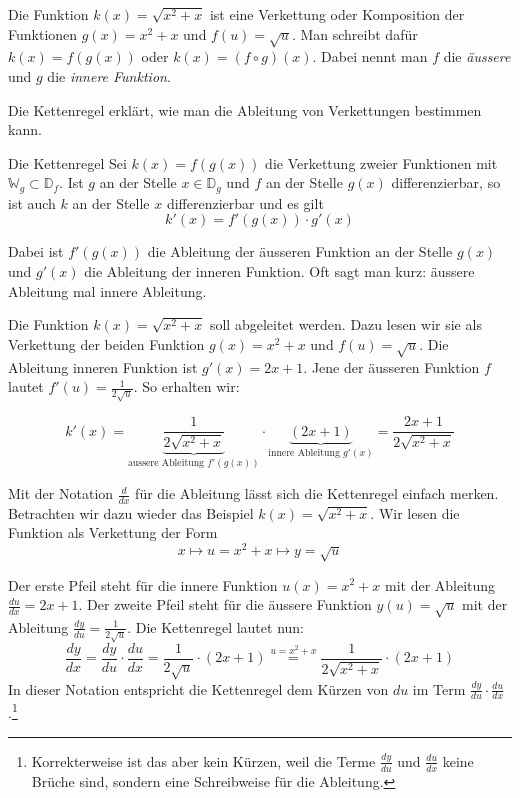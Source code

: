 \clearpage

Die Funktion $k(x)=\sqrt{x^2+x}$ ist eine Verkettung oder Komposition der Funktionen $g(x)=x^2+x$ und $f(u)=\sqrt{u}$. Man schreibt dafür $k(x)=f(g(x))$ oder $k(x)=(f\circ g)(x)$. Dabei nennt man $f$ die \emph{äussere} und $g$ die \emph{innere Funktion}.

Die Kettenregel erklärt, wie man die Ableitung von Verkettungen bestimmen kann.

\begin{satz}
	{Die Kettenregel}{}
	Sei $k(x)=f(g(x))$ die Verkettung zweier Funktionen mit $\mathbb{W}_g\subset \mathbb{D}_f$. Ist $g$ an der Stelle $x\in \mathbb{D}_g$ und $f$ an der Stelle $g(x)$ differenzierbar, so ist auch $k$ an der Stelle $x$ differenzierbar und es gilt
	$$k'(x)=f'(g(x))\cdot g'(x)$$

\end{satz}
Dabei ist $f'(g(x))$ die Ableitung der äusseren Funktion an der Stelle $g(x)$ und $g'(x)$ die Ableitung der inneren Funktion. Oft sagt man kurz: \glqq äussere Ableitung mal innere Ableitung\grqq{}.

\begin{bsp}
	{}{}
	Die Funktion $k(x)=\sqrt{x^2+x}$ soll abgeleitet werden. Dazu lesen wir sie als Verkettung der  beiden Funktion $g(x)=x^2+x$ und $f(u)=\sqrt{u}$. Die Ableitung inneren Funktion ist $g'(x) = 2x+1$. Jene der äusseren Funktion $f$ lautet $f'(u)=\frac{1}{2\sqrt{u}}$. So erhalten wir:

	$$k'(x) = \underbrace{\frac{1}{2\sqrt{x^2+x}}}_{\text{aussere Ableitung }f'(g(x))} \cdot \underbrace{(2x+1)}_{\text{innere Ableitung }g'(x)} = \frac{2x+1}{2\sqrt{x^2+x}}$$


\end{bsp}

Mit der Notation $\frac{d}{dx}$ für die Ableitung lässt sich die Kettenregel einfach merken. Betrachten wir dazu wieder das Beispiel $k(x)=\sqrt{x^2+x}$.
Wir lesen die Funktion als Verkettung der Form
$$x\mapsto u = x^2+x \mapsto y= \sqrt{u}$$

Der erste Pfeil steht für die innere Funktion $u(x)=x^2+x$ mit der Ableitung $\frac{du}{dx}=2x+1$. Der zweite Pfeil steht für die äussere Funktion $y(u)=\sqrt{u}$ mit der Ableitung $\frac{dy}{du}=\frac{1}{2\sqrt{u}}$. Die Kettenregel lautet nun:
$$\frac{dy}{dx}= \frac{dy}{du}\cdot \frac{du}{dx} = \frac{1}{2\sqrt{u}} \cdot (2x+1) \stackrel{u=x^2+x}{=} \frac{1}{2\sqrt{x^2+x}}\cdot (2x+1)$$
In dieser Notation entspricht die Kettenregel dem \glqq Kürzen\grqq{} von $du$ im Term $\frac{dy}{du}\cdot \frac{du}{dx}$.\footnote{Korrekterweise ist das aber kein Kürzen, weil die Terme $\frac{dy}{du}$ und $\frac{du}{dx}$ keine Brüche sind, sondern eine Schreibweise für die Ableitung.}


